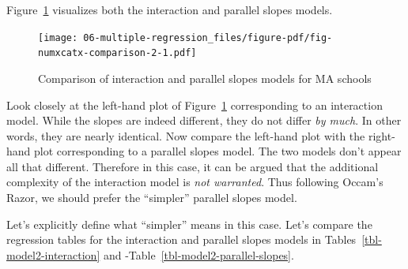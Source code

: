 \documentclass[
  letterpaper,
  DIV=11,
  numbers=noendperiod]{scrreprt}
\newenvironment{Shaded}{\begin{snugshade}}{\end{snugshade}}
\newcommand{\AttributeTok}[1]{\textcolor[rgb]{0.40,0.45,0.13}{#1}}
\newcommand{\FunctionTok}[1]{\textcolor[rgb]{0.28,0.35,0.67}{#1}}
\newcommand{\NormalTok}[1]{\textcolor[rgb]{0.00,0.23,0.31}{#1}}
\newcommand{\OtherTok}[1]{\textcolor[rgb]{0.00,0.23,0.31}{#1}}
\newcommand{\SpecialCharTok}[1]{\textcolor[rgb]{0.37,0.37,0.37}{#1}}
\theoremstyle{definition}
\theoremstyle{remark}
\begin{document}
Figure~\ref{fig-numxcatx-comparison-2} visualizes both the interaction
and parallel slopes models.

\begin{figure}

{\centering \texttt{[image: 06-multiple-regression\_files/figure-pdf/fig-numxcatx-comparison-2-1.pdf]}

}

\caption{\label{fig-numxcatx-comparison-2}Comparison of interaction and
parallel slopes models for MA schools}

\end{figure}

Look closely at the left-hand plot of
Figure~\ref{fig-numxcatx-comparison-2} corresponding to an interaction
model. While the slopes are indeed different, they do not differ
\emph{by much}. In other words, they are nearly identical. Now compare
the left-hand plot with the right-hand plot corresponding to a parallel
slopes model. The two models don't appear all that different. Therefore
in this case, it can be argued that the additional complexity of the
interaction model is \emph{not warranted}. Thus following Occam's Razor,
we should prefer the ``simpler'' parallel slopes model.

Let's explicitly define what ``simpler'' means in this case. Let's
compare the regression tables for the interaction and parallel slopes
models in Tables~\ref{tbl-model2-interaction} and
-Table~\ref{tbl-model2-parallel-slopes}.

\begin{Shaded}
\end{Shaded}
\end{document}
